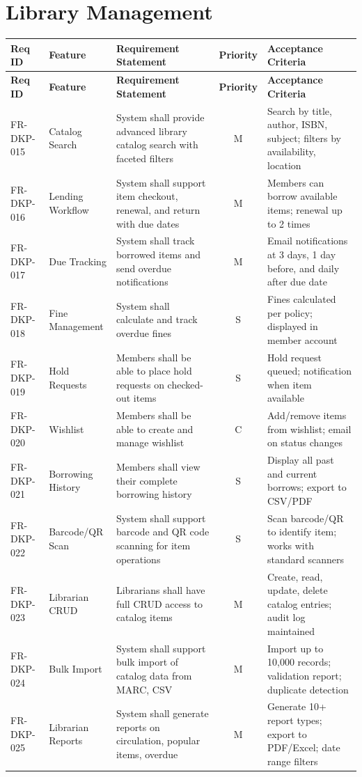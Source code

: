 \documentclass[12pt,a4paper]{report}
\begin{document}
\section{Library Management}
\begin{longtable}{|p{2cm}|p{3cm}|p{5cm}|c|p{3cm}|}
\hline
\textbf{Req ID} & \textbf{Feature} & \textbf{Requirement Statement} & \textbf{Priority} & \textbf{Acceptance Criteria} \\ \hline
\endfirsthead
\hline
\textbf{Req ID} & \textbf{Feature} & \textbf{Requirement Statement} & \textbf{Priority} & \textbf{Acceptance Criteria} \\ \hline
\endhead
FR-DKP-015 & Catalog Search & System shall provide advanced library catalog search with faceted filters & M & Search by title, author, ISBN, subject; filters by availability, location \\ \hline
FR-DKP-016 & Lending Workflow & System shall support item checkout, renewal, and return with due dates & M & Members can borrow available items; renewal up to 2 times \\ \hline
FR-DKP-017 & Due Tracking & System shall track borrowed items and send overdue notifications & M & Email notifications at 3 days, 1 day before, and daily after due date \\ \hline
FR-DKP-018 & Fine Management & System shall calculate and track overdue fines & S & Fines calculated per policy; displayed in member account \\ \hline
FR-DKP-019 & Hold Requests & Members shall be able to place hold requests on checked-out items & S & Hold request queued; notification when item available \\ \hline
FR-DKP-020 & Wishlist & Members shall be able to create and manage wishlist & C & Add/remove items from wishlist; email on status changes \\ \hline
FR-DKP-021 & Borrowing History & Members shall view their complete borrowing history & S & Display all past and current borrows; export to CSV/PDF \\ \hline
FR-DKP-022 & Barcode/QR Scan & System shall support barcode and QR code scanning for item operations & S & Scan barcode/QR to identify item; works with standard scanners \\ \hline
FR-DKP-023 & Librarian CRUD & Librarians shall have full CRUD access to catalog items & M & Create, read, update, delete catalog entries; audit log maintained \\ \hline
FR-DKP-024 & Bulk Import & System shall support bulk import of catalog data from MARC, CSV & M & Import up to 10,000 records; validation report; duplicate detection \\ \hline
FR-DKP-025 & Librarian Reports & System shall generate reports on circulation, popular items, overdue & M & Generate 10+ report types; export to PDF/Excel; date range filters \\ \hline
\end{longtable}
\end{document}
